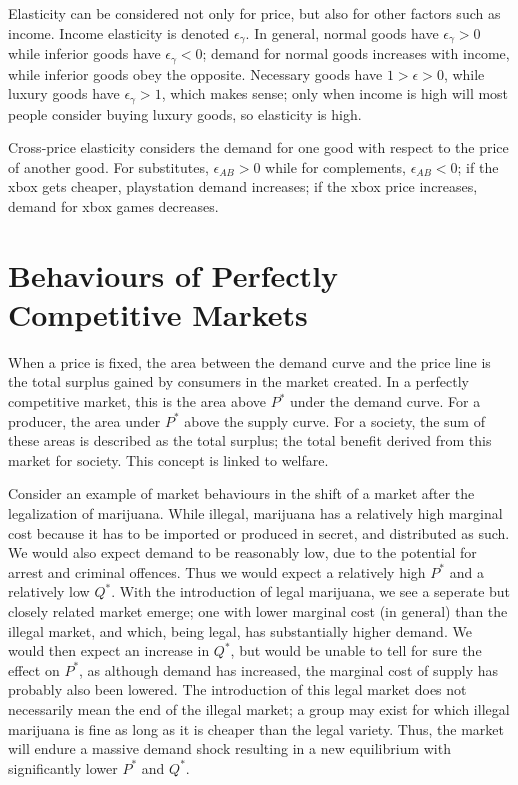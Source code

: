 \documentclass[12pt]{report}
\begin{document}
\bigskip
Elasticity can be considered not only for price, but also for other factors such as income. Income 
elasticity is denoted \(\epsilon_\gamma\). In general, normal goods have \(\epsilon_\gamma > 0\) while
inferior goods have \(\epsilon_\gamma < 0\); demand for normal goods increases with income, while inferior goods
obey the opposite. Necessary goods have \(1 > \epsilon > 0\), while luxury goods
have \(\epsilon_\gamma > 1\), which makes sense; only when income is high will most people consider buying
luxury goods, so elasticity is high.

\bigskip
Cross-price elasticity considers the demand for one good with respect to the price of another good. For
substitutes, \(\epsilon_{AB} > 0\) while for complements, \(\epsilon_{AB} < 0\); if the xbox gets 
cheaper, playstation demand increases; if the xbox price increases, demand for xbox games decreases.

\section*{Behaviours of Perfectly Competitive Markets}
When a price is fixed, the area between the demand curve and the price line is the total surplus gained
by consumers in the market created. In a perfectly competitive market, this is the area above \(P^*\) under
the demand curve. For a producer, the area under \(P^*\) above the supply curve. For a society, the sum of
these areas is described as the total surplus; the total benefit derived from this market for society. This
concept is linked to welfare.

\bigskip
Consider an example of market behaviours in the shift of a market after the legalization of marijuana.
While illegal, marijuana has a relatively high marginal cost because it has to be imported or produced 
in secret, and distributed as such. We would also expect demand to be reasonably low, due to the potential
for arrest and criminal offences. Thus we would expect a relatively high \(P^*\) and a relatively low \(Q^*\).
With the introduction of legal marijuana, we see a seperate but closely related market emerge; one with lower
marginal cost (in general) than the illegal market, and which, being legal, has substantially higher demand.
We would then expect an increase in \(Q^*\), but would be unable to tell for sure the effect on \(P^*\), as
although demand has increased, the marginal cost of supply has probably also been lowered. The introduction
of this legal market does not necessarily mean the end of the illegal market; a group may exist for which
illegal marijuana is fine as long as it is cheaper than the legal variety. Thus, the market will endure a 
massive demand shock resulting in a new equilibrium with significantly lower \(P^*\) and \(Q^*\).
\end{document}
